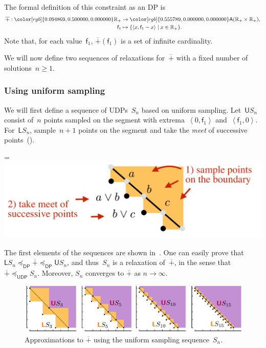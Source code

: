 \documentclass[twocolumn,english]{IEEEconf}
\theoremstyle{plain}
\theoremstyle{definition}
\theoremstyle{definition}
\theoremstyle{plain}
\newcommand{\reals}{\mathbb{R}}
\newcommand{\aword}[1]{\mathsf{#1}}
\newcommand{\vmath}[1]{\aword{#1}}
\newcommand{\posleq}{\preceq}
\newcommand{\antichains}{\vmath{A}}
\newcommand{\fun}{\vmath{f}}
\newcommand{\udpL}{\boldsymbol{\mathsf{L}}}
\newcommand{\udpU}{\boldsymbol{\mathsf{U}}}
\newcommand{\udpsp}{\vmath{UDP}}
\newcommand{\udpleq}{\posleq_\udpsp}
\newcommand{\dpsp}{\vmath{DP}}
\newcommand{\dpleq}{\posleq_\dpsp}
\newcommand{\colR}{\color[rgb]{0.555789,0.000000,0.000000}}
\newcommand{\colF}{\color[rgb]{0.094869,0.500000,0.000000}}
\newcommand*{\vcenteredhbox}[1]{\begingroup
\setbox0=\hbox{#1}\parbox{\wd0}{\box0}\endgroup}
\newcommand{\captionsideleft}[2]{
    \medskip
    \begin{minipage}{1.8cm}{
        \hfill
        \protect\captionof{figure}{#1}}\end{minipage}
    \begin{minipage}{6.6cm}
    
    \vcenteredhbox{{#2}}
    \hfill
    \end{minipage}
    \medskip
}
\begin{document}
The formal definition of this constraint as an DP is
\begin{align*}
\overline{+}:{\colF\reals_{+}} & \rightarrow{\colR\antichains(\reals_{+}\times\reals_{+})},\\
\fun_{1} & \mapsto\{\left\langle x,\fun_{1}-x\right\rangle \mid x\in\reals_{+}\}.
\end{align*}
Note that, for each value~$\fun_{1}$, $\overline{+}(\fun_{1})$
is a set of infinite cardinality. 

We will now define two sequences of relaxations for~$\overline{+}$
with a fixed number of solutions~$n\geq1$. 

\subsubsection*{Using uniform sampling}

We will first define a sequence of UDPs~$S_{n}$ based on uniform
sampling. Let~$\udpU S_{n}$ consist of~$n$ points sampled on the
segment with extrema~$\left\langle 0,\fun_{1}\right\rangle $ and~$\left\langle \fun_{1},0\right\rangle $.
For~$\udpL S_{n}$, sample~$n+1$ points on the segment and take
the \emph{meet} of successive points~(). 
\begin{center}
\captionsideleft{\label{fig:make_lower}}{\includegraphics[scale=0.33]{unc_make_lower}}
\par\end{center}

The first elements of the sequences are shown in~.
One can easily prove that $\udpL S_{n}\dpleq\overline{+}\dpleq\udpU S_{n}$,
and thus~$S_{n}$ is a relaxation of~$\overline{+}$, in the sense
that~$\overline{+}\udpleq S_{n}$. Moreover, $S_{n}$ converges to
$\overline{+}$ as $n\rightarrow\infty$. 
\begin{center}
\begin{figure}[H]
\centering{}\includegraphics[scale=0.33]{unc_sampling}\caption{\label{fig:approx_invplus}Approximations to $\overline{+}$ using
the uniform sampling sequence~$S_{n}$. }
\end{figure}
\par\end{center}
\end{document}
